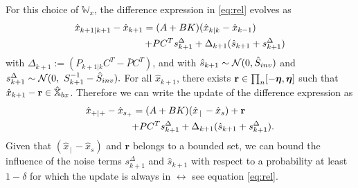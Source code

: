 \documentclass{ifacconf}
\begin{document}
For this choice of  	$\mathbb W_x$, the difference expression in \eqref{eq:rel} evolves   as 
\begin{align}
 \hat x_{k+1|k+1}-	\hat x_{k+1}=(A+BK)(\hat x_{k|k}-\hat x_{k-1})\qquad \quad\notag\\+  \bar P   C^T s^\Delta_{k+1} +\Delta_{k+1}( \hat{s}_{k+1}+ s^\Delta_{k+1})
\end{align}
 with $\Delta_{k+1}:=(P_{k+1|k}C^T-  \bar P   C^T)$, and with $ \hat{s}_{k+1}\sim \CA N (0,\hat{S}_{inv})$ and $ s^\Delta_{k+1}\sim  \CA N (0,\  S_{k+1}^{-1}-\hat{S}_{inv}). $
For all $ \hat x_{k+1}$, there exists $\mathbf  r \in \prod_n[-\grid ,\grid]$ such that   $\hat x_{k+1}-\mathbf r \in \hat \X_{bx}$. Therefore we can write the update of the difference expression as  \begin{align}
 \hat x_{+|+}-	\hat x_{s_+}=(A+BK)(\hat x_{\,|\,}-\hat x_s)+\mathbf r\qquad \quad\notag\\+  \bar P   C^T s^\Delta_{k+1} +\Delta_{k+1}( \hat{s}_{k+1}+ s^\Delta_{k+1}).
\end{align}
Given that $(\hat x_{\,|\,}-\hat x_s)$ and  $\mathbf r$ belongs to a bounded set, we can bound the influence of the noise terms $s^\Delta_{k+1}$ and $ \hat{s}_{k+1}$ with respect to a probability at least $1-\delta$ for which the update is always in $\rel$ see equation \eqref{eq:rel}.
\end{document}
